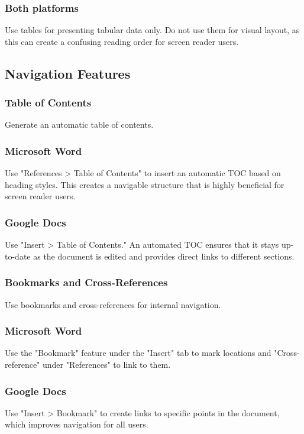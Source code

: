 \subsubsection{Both platforms}\label{ch15:sssec:tables-both}
Use tables for presenting tabular data only. Do not use them for visual layout, as this can create a confusing reading order for screen reader users.

\subsection{Navigation Features}\label{ch15:ssec:nav-features}

\subsubsection{Table of Contents}\label{ch15:sssec:toc}
Generate an automatic table of contents.

\subsubsection{Microsoft Word}\label{ch15:sssec:word-toc}
Use "References > Table of Contents" to insert an automatic TOC based on heading styles. This creates a navigable structure that is highly beneficial for screen reader users.

\subsubsection{Google Docs}\label{ch15:sssec:docs-toc}
Use "Insert > Table of Contents." An automated TOC ensures that it stays up-to-date as the document is edited and provides direct links to different sections.

\subsubsection{Bookmarks and Cross-References}\label{ch15:sssec:bookmarks-cross-refs}
Use bookmarks and cross-references for internal navigation.

\subsubsection{Microsoft Word}\label{ch15:sssec:word-bookmarks}
Use the "Bookmark" feature under the "Insert" tab to mark locations and "Cross-reference" under "References" to link to them.

\subsubsection{Google Docs}\label{ch15:sssec:docs-bookmarks}
Use "Insert > Bookmark" to create links to specific points in the document, which improves navigation for all users.

